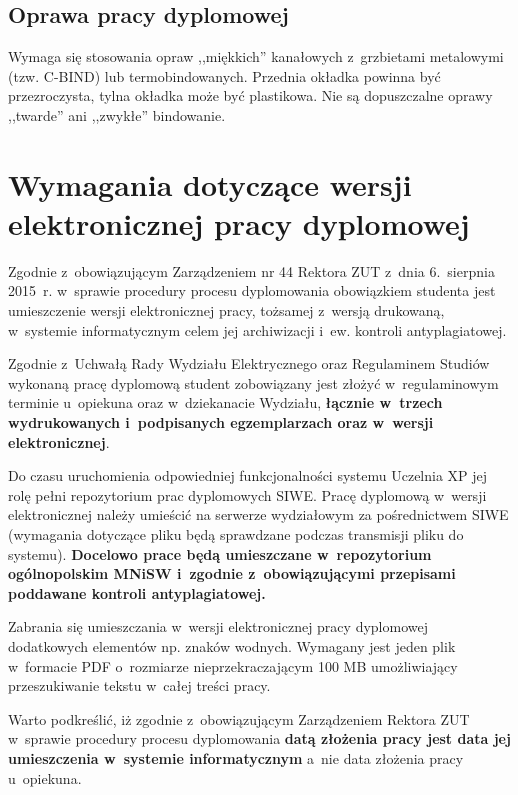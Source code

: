 \documentclass[skorowidz,skroty]{dyplomWEZUT}
\begin{document}

\section{Oprawa pracy dyplomowej}\label{sec:oprawa}

Wymaga się stosowania opraw ,,miękkich'' kanałowych z~grzbietami metalowymi (tzw. C-BIND) lub termobindowanych. Przednia okładka powinna być przezroczysta, tylna okładka może być plastikowa. Nie są dopuszczalne oprawy ,,twarde'' ani ,,zwykłe'' bindowanie.

\chapter{Wymagania dotyczące wersji elektronicznej pracy dyplomowej}\label{chap:welektroniczna}

Zgodnie z~obowiązującym Zarządzeniem nr 44 Rektora ZUT z~dnia 6.~sierpnia 2015~r. w~sprawie procedury procesu dyplomowania obowiązkiem studenta jest umieszczenie wersji elektronicznej pracy, tożsamej z~wersją drukowaną, w~systemie informatycznym celem jej archiwizacji i~ew. kontroli antyplagiatowej.

Zgodnie z~Uchwałą Rady Wydziału Elektrycznego oraz Regulaminem Studiów wykonaną pracę dyplomową student zobowiązany jest złożyć w~regulaminowym terminie u~opiekuna oraz w~dziekanacie Wydziału, \textbf{łącznie w~trzech wydrukowanych i~podpisanych egzemplarzach oraz w~wersji elektronicznej}.

Do czasu uruchomienia odpowiedniej funkcjonalności systemu Uczelnia XP jej rolę pełni repozytorium prac dyplomowych SIWE. Pracę dyplomową w~wersji elektronicznej należy umieścić na serwerze wydziałowym za pośrednictwem SIWE (wymagania dotyczące pliku będą sprawdzane podczas transmisji pliku do systemu). \textbf{Docelowo prace będą umieszczane w~repozytorium ogólnopolskim MNiSW i~zgodnie z~obowiązującymi przepisami poddawane kontroli antyplagiatowej.}

Zabrania się umieszczania w~wersji elektronicznej pracy dyplomowej dodatkowych elementów np. znaków wodnych. Wymagany jest jeden plik w~formacie PDF o~rozmiarze nieprzekraczającym 100 MB umożliwiający przeszukiwanie tekstu w~całej treści pracy.

Warto podkreślić, iż zgodnie z~obowiązującym Zarządzeniem Rektora ZUT w~sprawie procedury procesu dyplomowania \textbf{datą złożenia pracy jest data jej umieszczenia w~systemie informatycznym} a~nie data złożenia pracy u~opiekuna.
\end{document}
